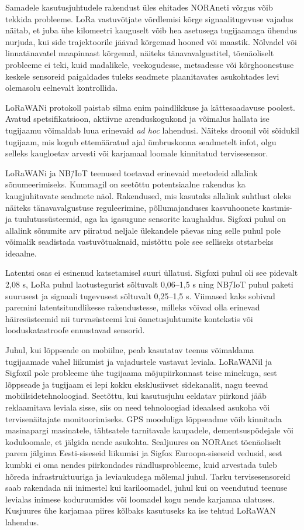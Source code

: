 \documentclass[12pt]{article}
\begin{document}
    Samadele kasutusjuhtudele rakendust üles ehitades NORAneti võrgus võib tekkida probleeme.
    LoRa vastuvõtjate võrdlemisi kõrge signaalitugevuse vajadus näitab, et juba ühe kilomeetri kauguselt võib hea asetusega tugijaamaga ühendus nurjuda, kui side trajektoorile jäävad kõrgemad hooned või maastik.
    Nõlvadel või linnatänavatel maapinnast kõrgemal, näiteks tänavavalgustitel, tõenäoliselt probleeme ei teki, kuid madalikele, veekogudesse, metsadesse või kõrghoonestuse keskele sensoreid paigaldades tuleks seadmete plaanitavates asukohtades levi olemasolu eelnevalt kontrollida.

    LoRaWANi protokoll paistab silma enim paindlikkuse ja kättesaadavuse poolest.
    Avatud spetsifikatsioon, aktiivne arenduskogukond ja võimalus hallata ise tugijaamu võimaldab luua erinevaid \textit{ad hoc} lahendusi.
    Näiteks droonil või sõidukil tugijaam, mis kogub ettemääratud ajal ümbruskonna seadmetelt infot, olgu selleks kaugloetav arvesti või karjamaal loomale kinnitatud tervisesensor.

    LoRaWANi ja NB\=/IoT teenused toetavad erinevaid meetodeid allalink sõnumeerimiseks.
    Kummagil on seetõttu potentsiaalne rakendus ka kaugjuhitavate seadmete näol.
    Rakendused, mis kasutaks allalink suhtlust oleks näiteks tänavavalgustuse reguleerimine, põllumajanduses kasvuhoonete kastmis- ja tuulutussüsteemid, aga ka igasugune sensorite kaughaldus.
    Sigfoxi puhul on allalink sõnumite arv piiratud neljale ülekandele päevas ning selle puhul pole võimalik seadistada vastuvõtuaknaid, mistõttu pole see selliseks otstarbeks ideaalne.

    Latentsi osas ei esinenud katsetamisel suuri üllatusi.
    Sigfoxi puhul oli see pidevalt 2,08 s, LoRa puhul laotustegurist sõltuvalt 0,06--1,5 s ning NB\=/IoT puhul paketi suurusest ja signaali tugevusest sõltuvalt 0,25--1,5 s.
    Viimased kaks sobivad paremini latentsitundlikesse rakendustesse, milleks võivad olla erinevad häiresüsteemid nii turvasüsteemi kui õnnetusjuhtumite kontekstis või looduskatastroofe ennustavad sensorid.

    Juhul, kui lõppseade on mobiilne, peab kasutatav teenus võimaldama tugijaamade vahel liikumist ja vajadustele vastavat leviala.
    LoRaWANil ja Sigfoxil pole probleeme ühe tugijaama mõjupiirkonnast teise minekuga, sest lõppseade ja tugijaam ei lepi kokku eksklusiivset sidekanalit, nagu teevad mobiilsidetehnoloogiad.
    Seetõttu, kui kasutusjuhu eeldatav piirkond jääb reklaamitava leviala sisse, siis on need tehnoloogiad ideaalsed asukoha või tervisenäitajate monitoorimiseks.
    GPS mooduliga lõppseadme võib kinnitada masinapargi masinatele, tähtsatele tarnitavale kaupadele, dementsuspõdejale või koduloomale, et jälgida nende asukohta.
    Sealjuures on NORAnet tõenäoliselt parem jälgima Eesti-siseseid liikumisi ja Sigfox Euroopa-siseseid vedusid, sest kumbki ei oma nendes piirkondades rändlusprobleeme, kuid arvestada tuleb hõreda infrastruktuuriga ja leviaukudega mõlemal juhul.
    Tarku tervisesensoreid saab rakendada nii inimestel kui kariloomadel, juhul kui on veendutud teenuse levialas inimese koduruumides või loomadel kogu nende karjamaa ulatuses.
    Kusjuures ühe karjamaa piires kõlbaks kasutuseks ka ise tehtud LoRaWAN lahendus.
\end{document}
